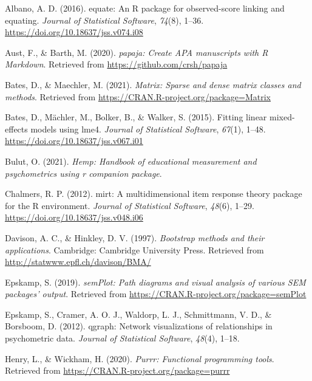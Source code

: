 \documentclass[
  english,
  man]{apa6}
\newlength{\cslhangindent}
\newenvironment{CSLReferences}[2] %
 {%
  \setlength{\parindent}{0pt}
  \ifodd #1 \everypar{\setlength{\hangindent}{\cslhangindent}}\ignorespaces\fi
  \ifnum #2 > 0
  \setlength{\parskip}{#2\baselineskip}
  \fi
 }%
 {}
\begin{document}
\hypertarget{refs}{}
\begin{CSLReferences}{1}{0}
\leavevmode{}%
Albano, A. D. (2016). {equate}: An {R} package for observed-score linking and equating. \emph{Journal of Statistical Software}, \emph{74}(8), 1--36. \url{https://doi.org/10.18637/jss.v074.i08}

\leavevmode{}%
Aust, F., \& Barth, M. (2020). \emph{{papaja}: {Create} {APA} manuscripts with {R Markdown}}. Retrieved from \url{https://github.com/crsh/papaja}

\leavevmode{}%
Bates, D., \& Maechler, M. (2021). \emph{Matrix: Sparse and dense matrix classes and methods}. Retrieved from \url{https://CRAN.R-project.org/package=Matrix}

\leavevmode{}%
Bates, D., Mächler, M., Bolker, B., \& Walker, S. (2015). Fitting linear mixed-effects models using {lme4}. \emph{Journal of Statistical Software}, \emph{67}(1), 1--48. \url{https://doi.org/10.18637/jss.v067.i01}

\leavevmode{}%
Bulut, O. (2021). \emph{Hemp: Handbook of educational measurement and psychometrics using r companion package}.

\leavevmode{}%
Chalmers, R. P. (2012). {mirt}: A multidimensional item response theory package for the {R} environment. \emph{Journal of Statistical Software}, \emph{48}(6), 1--29. \url{https://doi.org/10.18637/jss.v048.i06}

\leavevmode{}%
Davison, A. C., \& Hinkley, D. V. (1997). \emph{Bootstrap methods and their applications}. Cambridge: Cambridge University Press. Retrieved from \url{http://statwww.epfl.ch/davison/BMA/}

\leavevmode{}%
Epskamp, S. (2019). \emph{semPlot: Path diagrams and visual analysis of various SEM packages' output}. Retrieved from \url{https://CRAN.R-project.org/package=semPlot}

\leavevmode{}%
Epskamp, S., Cramer, A. O. J., Waldorp, L. J., Schmittmann, V. D., \& Borsboom, D. (2012). {qgraph}: Network visualizations of relationships in psychometric data. \emph{Journal of Statistical Software}, \emph{48}(4), 1--18.

\leavevmode{}%
Henry, L., \& Wickham, H. (2020). \emph{Purrr: Functional programming tools}. Retrieved from \url{https://CRAN.R-project.org/package=purrr}


\end{CSLReferences}
\end{document}
